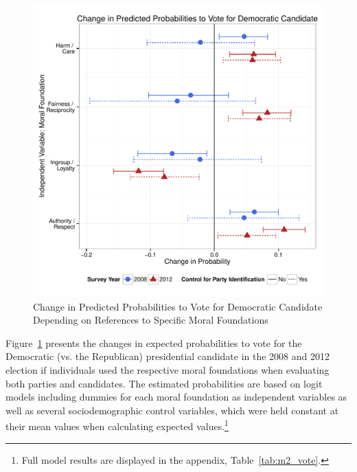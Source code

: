 \documentclass[12pt]{paper}
\begin{document}
\begin{figure}[ht]\centering
\includegraphics[scale=.6]{../calc/fig/m2_vote.pdf}
\caption{Change in Predicted Probabilities to Vote for Democratic Candidate Depending on References to Specific Moral Foundations}\label{fig:m2_vote}
\end{figure}

Figure~\ref{fig:m2_vote} presents the changes in expected probabilities to vote for the Democratic (vs. the Republican) presidential candidate in the 2008 and 2012 election if individuals used the respective moral foundations when evaluating both parties and candidates. The estimated probabilities are based on logit models including dummies for each moral foundation as independent variables as well as several sociodemographic control variables, which were held constant at their mean values when calculating expected values.\footnote{Full model results are displayed in the appendix, Table~\ref{tab:m2_vote}.}
\end{document}
